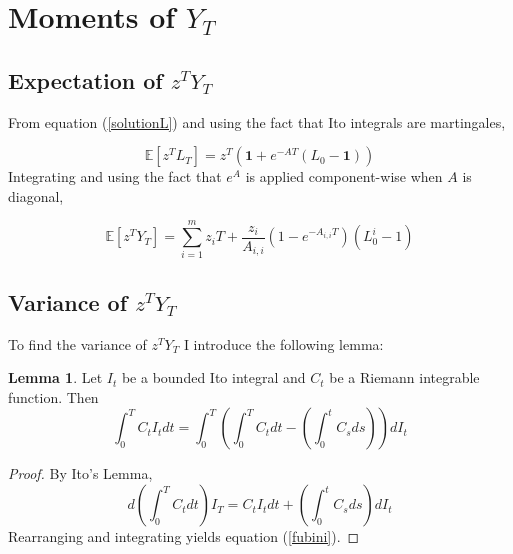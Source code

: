\documentclass[12pt]{article}
\theoremstyle{definition}
\newtheorem{lemma}{Lemma}
\begin{document}
\newpage
\appendix

\section{Moments of \(Y_T\)} \label{mY}

\subsection{Expectation of \(z^T Y_T\)}
From equation (\ref{solutionL}) and using the fact that Ito integrals are martingales, 

\begin{equation}
\mathbb{E}[z^T L_T]=z^T \left(\mathbf{1}+e^{-AT}(L_0-\mathbf{1})\right)
\end{equation}
Integrating and using the fact that \(e^A\) is applied component-wise when \(A\) is diagonal,

\begin{equation}
\mathbb{E}[z^T Y_T]=\sum_{i=1} ^ m z_i T+\frac{z_i}{A_{i,i}}\left(1-e^{-{A}_{i, i}T}\right)(L_0^ i-1)\end{equation}

\subsection{Variance of \(z^T Y_T\)}
To find the variance of \(z^T Y_T\) I introduce the following lemma:

\begin{lemma} \label{lemma1}
Let \(I_t\) be a bounded Ito integral  and \(C_t\) be a Riemann integrable function.  Then 
\begin{equation} \label{fubini} \int_ 0^ T  C_t I_t dt=  \int_ 0^ T \left(\int_0 ^ T C_t  dt-\left(\int_0 ^ t C_s ds\right)\right) dI_t
\end{equation}

\end{lemma}

\begin{proof}
By Ito's Lemma,
\begin{equation}
d\left(\int_0 ^ T C_t dt\right) I_T= C_t I_t dt +\left(\int_0 ^ t C_s ds\right) dI_t
\end{equation}
Rearranging and integrating yields equation (\ref{fubini}).
\end{proof}
\end{document}

